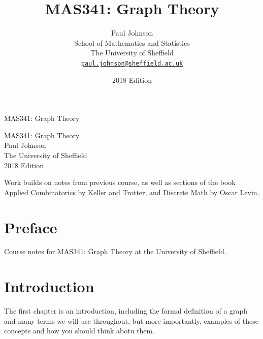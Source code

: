 \documentclass[10pt,]{book}
\title{MAS341: Graph Theory}
\author{Paul Johnson\\
School of Mathematics and Statistics\\
The University of Sheffield\\
\href{mailto:paul.johnson@sheffield.ac.uk}{\nolinkurl{paul.johnson@sheffield.ac.uk}}
}
\date{2018 Edition}
\theoremstyle{plain}
\theoremstyle{definition}
\theoremstyle{definition}
\theoremstyle{definition}
\begin{document}
\frontmatter
\thispagestyle{empty}
{\centering
\vspace*{0.28\textheight}
{\Huge MAS341: Graph Theory}\\}
\clearpage
\thispagestyle{empty}
\null%
\clearpage
\thispagestyle{empty}
{\centering
\vspace*{0.14\textheight}
{\Huge MAS341: Graph Theory}\\[3\baselineskip]
{\Large Paul Johnson}\\[0.5\baselineskip]
{\Large The University of Sheffield}\\[3\baselineskip]
{\Large 2018 Edition}\\}
\clearpage
\thispagestyle{empty}
\null\clearpage
\hypertarget{p-1}{}%
Work builds on notes from previous course, as well as sections of the book Applied Combinatorics by Keller and Trotter, and Discrete Math by Oscar Levin.%
\chapter*{Preface}\label{preface-1}
Course notes for MAS341: Graph Theory at the University of Sheffield.%
\setcounter{tocdepth}{1}
\renewcommand*\contentsname{Contents}
\tableofcontents
\mainmatter
\typeout{************************************************}
\typeout{************************************************}
\chapter[{Introduction}]{Introduction}\label{ch_intro}
\hypertarget{p-2}{}%
The first chapter is an introduction, including the formal definition of a graph and many terms we will use throughout, but more importantly, examples of these concepts and how you should think abotu them.%
\typeout{************************************************}
\typeout{************************************************}
\end{document}
